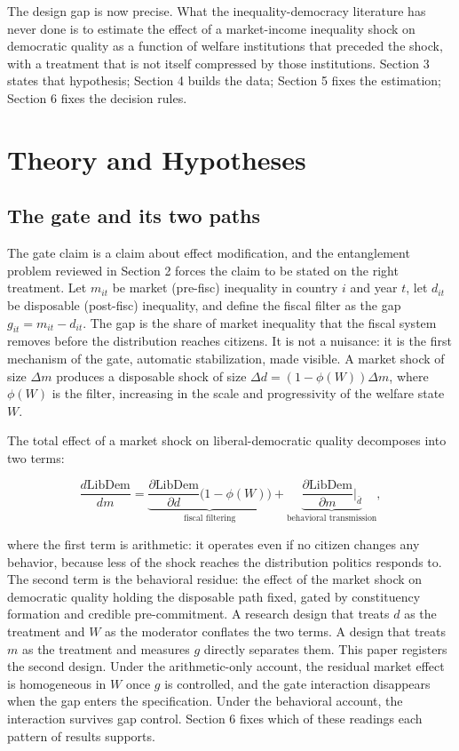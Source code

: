 The design gap is now precise. What the inequality-democracy literature has never done is to estimate the effect of a market-income inequality shock on democratic quality as a function of welfare institutions that preceded the shock, with a treatment that is not itself compressed by those institutions. Section 3 states that hypothesis; Section 4 builds the data; Section 5 fixes the estimation; Section 6 fixes the decision rules.

\section{Theory and Hypotheses}

\subsection{The gate and its two paths}

The gate claim is a claim about effect modification, and the entanglement problem reviewed in Section 2 forces the claim to be stated on the right treatment. Let $m_{it}$ be market (pre-fisc) inequality in country $i$ and year $t$, let $d_{it}$ be disposable (post-fisc) inequality, and define the fiscal filter as the gap $g_{it} = m_{it} - d_{it}$. The gap is the share of market inequality that the fiscal system removes before the distribution reaches citizens. It is not a nuisance: it is the first mechanism of the gate, automatic stabilization, made visible. A market shock of size $\Delta m$ produces a disposable shock of size $\Delta d = (1 - \phi(W)) \Delta m$, where $\phi(W)$ is the filter, increasing in the scale and progressivity of the welfare state $W$.

The total effect of a market shock on liberal-democratic quality decomposes into two terms:

\[
\frac{d \text{LibDem}}{d m} = \underbrace{\frac{\partial \text{LibDem}}{\partial d} \big(1 - \phi(W)\big)}_{\text{fiscal filtering}} + \underbrace{\frac{\partial \text{LibDem}}{\partial m}\Big|_{\bar d}}_{\text{behavioral transmission}},
\]

where the first term is arithmetic: it operates even if no citizen changes any behavior, because less of the shock reaches the distribution politics responds to. The second term is the behavioral residue: the effect of the market shock on democratic quality holding the disposable path fixed, gated by constituency formation and credible pre-commitment. A research design that treats $d$ as the treatment and $W$ as the moderator conflates the two terms. A design that treats $m$ as the treatment and measures $g$ directly separates them. This paper registers the second design. Under the arithmetic-only account, the residual market effect is homogeneous in $W$ once $g$ is controlled, and the gate interaction disappears when the gap enters the specification. Under the behavioral account, the interaction survives gap control. Section 6 fixes which of these readings each pattern of results supports.

